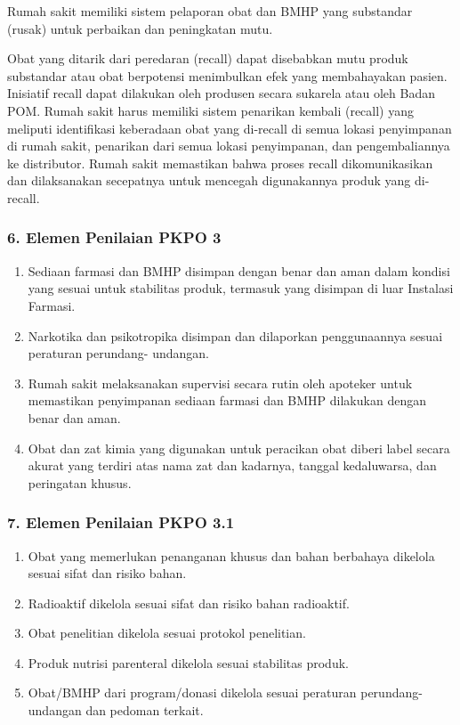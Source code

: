 \documentclass[
]{book}
\providecommand{\tightlist}{%
  \setlength{\itemsep}{0pt}\setlength{\parskip}{0pt}}
\begin{document}
Rumah sakit memiliki sistem pelaporan obat dan BMHP yang substandar (rusak) untuk perbaikan dan peningkatan mutu.

Obat yang ditarik dari peredaran (recall) dapat disebabkan mutu produk substandar atau obat berpotensi menimbulkan efek yang membahayakan pasien. Inisiatif recall dapat dilakukan oleh produsen secara sukarela atau oleh Badan POM. Rumah sakit harus memiliki sistem penarikan kembali (recall) yang meliputi identifikasi keberadaan obat yang di-recall di semua lokasi penyimpanan di rumah sakit, penarikan dari semua lokasi penyimpanan, dan pengembaliannya ke distributor. Rumah sakit memastikan bahwa proses recall dikomunikasikan dan dilaksanakan secepatnya untuk mencegah digunakannya produk yang di-recall.

\hypertarget{elemen-penilaian-pkpo-3}{%
\subsubsection*{6. Elemen Penilaian PKPO 3}\label{elemen-penilaian-pkpo-3}}

\begin{enumerate}
\def\labelenumi{\alph{enumi}.}
\tightlist
\item
  Sediaan farmasi dan BMHP disimpan dengan benar dan aman dalam kondisi yang sesuai untuk stabilitas produk, termasuk yang disimpan di luar Instalasi Farmasi.
\item
  Narkotika dan psikotropika disimpan dan dilaporkan penggunaannya sesuai peraturan perundang- undangan.
\item
  Rumah sakit melaksanakan supervisi secara rutin oleh apoteker untuk memastikan penyimpanan sediaan farmasi dan BMHP dilakukan dengan benar dan aman.
\item
  Obat dan zat kimia yang digunakan untuk peracikan obat diberi label secara akurat yang terdiri atas nama zat dan kadarnya, tanggal kedaluwarsa, dan peringatan khusus.
\end{enumerate}

\hypertarget{elemen-penilaian-pkpo-3.1}{%
\subsubsection*{7. Elemen Penilaian PKPO 3.1}\label{elemen-penilaian-pkpo-3.1}}

\begin{enumerate}
\def\labelenumi{\alph{enumi}.}
\tightlist
\item
  Obat yang memerlukan penanganan khusus dan bahan berbahaya dikelola sesuai sifat dan risiko bahan.
\item
  Radioaktif dikelola sesuai sifat dan risiko bahan radioaktif.
\item
  Obat penelitian dikelola sesuai protokol penelitian.
\item
  Produk nutrisi parenteral dikelola sesuai stabilitas produk.
\item
  Obat/BMHP dari program/donasi dikelola sesuai peraturan perundang-undangan dan pedoman terkait.
\end{enumerate}
\end{document}
